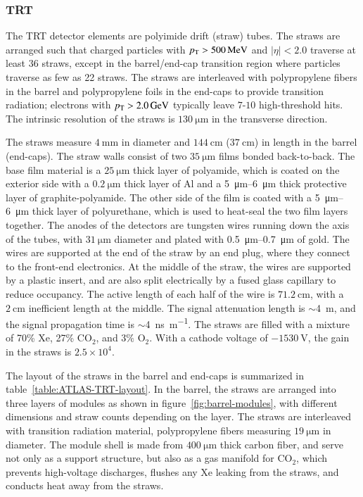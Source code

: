 \subsubsection{TRT}\label{sec:ATLAS-id-trt}

The TRT detector elements are polyimide drift (straw) tubes. The straws are arranged such that charged particles with $p_{\text{T}} > \SI{500}{\mega\electronvolt}$ and $|\eta|<2.0$ traverse at least 36 straws, except in the barrel/end-cap transition region where particles traverse as few as 22 straws. The straws are interleaved with polypropylene fibers in the barrel and polypropylene foils in the end-caps to provide transition radiation; electrons with $p_{\text{T}}>\SI{2.0}{\giga\electronvolt}$ typically leave $7$-$10$ high-threshold hits. The intrinsic resolution of the straws is $\SI{130}{\micro\meter}$ in the transverse direction.

The straws measure $\SI{4}{\milli\meter}$ in diameter and $\SI{144}{\centi\meter}$ ($\SI{37}{\centi\meter}$) in length in the barrel (end-caps). The straw walls consist of two $\SI{35}{\micro\meter}$ films bonded back-to-back. The base film material is a $\SI{25}{\micro\meter}$ thick layer of polyamide, which is coated on the exterior side with a $\SI{0.2}{\micro\meter}$ thick layer of Al and a \SIrange[range-phrase=-]{5}{6}{\micro\meter} thick protective layer of graphite-polyamide. The other side of the film is coated with a \SIrange[range-phrase=-]{5}{6}{\micro\meter} thick layer of polyurethane, which is used to heat-seal the two film layers together. The anodes of the detectors are tungsten wires running down the axis of the tubes, with $\SI{31}{\micro\meter}$ diameter and plated with \SIrange[range-phrase=-]{0.5}{0.7}{\micro\meter} of gold. The wires are supported at the end of the straw by an end plug, where they connect to the front-end electronics. At the middle of the straw, the wires are supported by a plastic insert, and are also split electrically by a fused glass capillary to reduce occupancy. The active length of each half of the wire is $\SI{71.2}{\centi\meter}$, with a $\SI{2}{\centi\meter}$ inefficient length at the middle. The signal attenuation length is $\sim$\SI{4}{\meter}, and the signal propagation time is $\sim$\SI[per-mode=fraction]{4}{\nano\second\per\meter}. The straws are filled with a mixture of 70\% Xe, 27\% CO$_2$, and $3\%$ O$_2$. With a cathode voltage of $\SI{-1530}{\volt}$, the gain in the straws is $2.5\times 10^4$.

The layout of the straws in the barrel and end-caps is summarized in table~\ref{table:ATLAS-TRT-layout}. In the barrel, the straws are arranged into three layers of modules as shown in figure~\ref{fig:barrel-modules}, with different dimensions and straw counts depending on the layer. The straws are interleaved with transition radiation material, polypropylene fibers measuring $\SI{19}{\micro\meter}$ in diameter. The module shell is made from $\SI{400}{\micro\meter}$ thick carbon fiber, and serve not only as a support structure, but also as a gas manifold for CO$_2$, which prevents high-voltage discharges, flushes any Xe leaking from the straws, and conducts heat away from the straws.  

